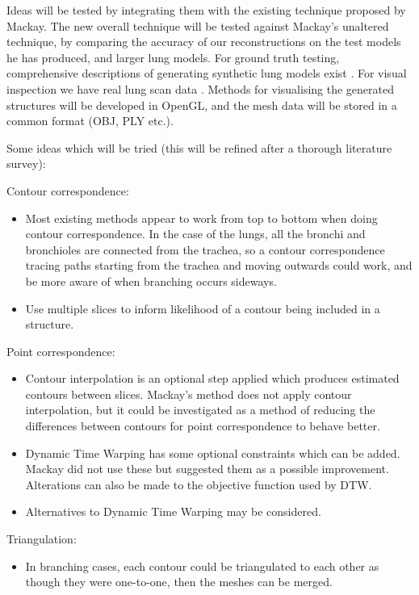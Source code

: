 \documentclass{IEEEtran}
\begin{document}
Ideas will be tested by integrating them with the existing technique proposed by Mackay. The new overall technique will be tested against Mackay’s unaltered technique, by comparing the accuracy of our reconstructions on the test models he has produced, and larger lung models. For ground truth testing, comprehensive descriptions of generating synthetic lung models exist \cite{pluta2012new}. For visual inspection we have real lung scan data \cite{mukundan2016reconstruction}. Methods for visualising the generated structures will be developed in OpenGL, and the mesh data will be stored in a common format (OBJ, PLY etc.). 

Some ideas which will be tried (this will be refined after a thorough literature survey):

Contour correspondence:
\begin{itemize}
\item Most existing methods appear to work from top to bottom when doing contour correspondence. In the case of the lungs, all the bronchi and bronchioles are connected from the trachea, so a contour correspondence tracing paths starting from the trachea and moving outwards could work, and be more aware of when branching occurs sideways.
\item Use multiple slices to inform likelihood of a contour being included in a structure.
\end{itemize}

Point correspondence:
\begin{itemize}
\item Contour interpolation is an optional step applied which produces estimated contours between slices. Mackay’s method does not apply contour interpolation, but it could be investigated as a method of reducing the differences between contours for point correspondence to behave better.
\item Dynamic Time Warping has some optional constraints which can be added. Mackay did not use these but suggested them as a possible improvement. Alterations can also be made to the objective function used by DTW.
\item Alternatives to Dynamic Time Warping may be considered.
\end{itemize}

Triangulation:
\begin{itemize}
\item In branching cases, each contour could be triangulated to each other as though they were one-to-one, then the meshes can be merged.
\end{itemize}
\end{document}
